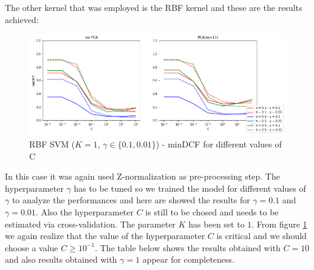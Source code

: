 \documentclass[10pt, a4paper, twocolumn]{article} %
\begin{document}
The other kernel that was employed is the RBF kernel and these are the results achieved:
\begin{figure}[ht!]
	\includegraphics[width=\linewidth]{./Pictures/FeaturesAnalysis/rbfsvm_znorm_compl.png}
	\caption{RBF SVM ($K=1$, $\gamma \in \{0.1, 0.01\}$) - minDCF for different values of C}
	\label{rbfsvm_znorm} 
\end{figure}
In this case it was again used Z-normalization as pre-processing step. The hyperparameter $\gamma$ has to be tuned
so we trained the model for different values of $\gamma$ to analyze the performances and here are showed
the results for $\gamma = 0.1$ and $\gamma = 0.01$. Also the hyperparameter $C$ is still to be
chosed and needs to be estimated via cross-validation. The parameter $K$ has been set to $1$.
From figure \ref{rbfsvm_znorm} we again realize that the value of the hyperparameter $C$ is critical and we should choose a value
$C \ge 10^{-1}$. The table below shows the results obtained with $C=10$ and also results
obtained with $\gamma = 1$ appear for completeness.
\FloatBarrier
\end{document}
